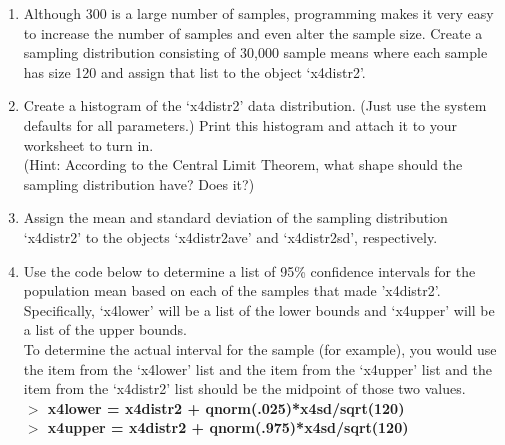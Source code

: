 \documentclass{article}
\newcommand{\Rin}[1]{\textbf{$>$ {#1}}}
\begin{document}
\begin{enumerate}
\begin{enumerate}
	\item Although 300 is a large number of samples, programming makes it very easy to increase the number of samples and even alter the sample size. Create a sampling distribution consisting of 30,000 sample means where each sample has size 120 and assign that list to the object `x4distr2'.
	\item Create a histogram of the `x4distr2' data distribution. (Just use the system defaults for all parameters.) Print this histogram and attach it to your worksheet to turn in. \\
	(Hint: According to the Central Limit Theorem, what shape should the sampling distribution have? Does it?)
	\item Assign the mean and standard deviation of the sampling distribution `x4distr2' to the objects `x4distr2ave' and `x4distr2sd', respectively.
	
  \item Use the code below to determine a list of 95\% confidence intervals for the population mean based on each of the samples that made 'x4distr2'. Specifically, `x4lower' will be a list of the lower bounds and `x4upper' will be a list of the upper bounds. \\
  To determine the actual interval for the  sample (for example), you would use the  item from the `x4lower' list and the  item from the `x4upper' list and the  item from the `x4distr2' list should be the midpoint of those two values.\\
  \Rin{x4lower = x4distr2 + qnorm(.025)*x4sd/sqrt(120)} \\
  \Rin{x4upper = x4distr2 + qnorm(.975)*x4sd/sqrt(120)}
	\end{enumerate}


\end{enumerate}
\end{document}

